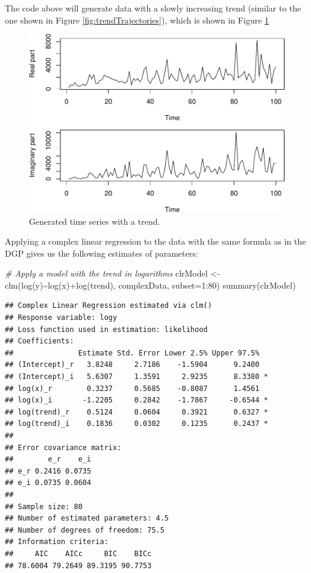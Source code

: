 \documentclass[
]{book}
\newenvironment{Shaded}{\begin{snugshade}}{\end{snugshade}}
\newcommand{\AttributeTok}[1]{\textcolor[rgb]{0.77,0.63,0.00}{#1}}
\newcommand{\CommentTok}[1]{\textcolor[rgb]{0.56,0.35,0.01}{\textit{#1}}}
\newcommand{\DecValTok}[1]{\textcolor[rgb]{0.00,0.00,0.81}{#1}}
\newcommand{\FunctionTok}[1]{\textcolor[rgb]{0.00,0.00,0.00}{#1}}
\newcommand{\NormalTok}[1]{#1}
\newcommand{\OtherTok}[1]{\textcolor[rgb]{0.56,0.35,0.01}{#1}}
\newcommand{\SpecialCharTok}[1]{\textcolor[rgb]{0.00,0.00,0.00}{#1}}
\begin{document}
The code above will generate data with a slowly increasing trend (similar to the one shown in Figure \ref{fig:trendTrajectories}), which is shown in Figure \ref{fig:dataWithTrend}

\begin{figure}
\centering
\includegraphics{Svetunkov---Svetunkov---Complex-Valued-Econometrics_files/figure-latex/dataWithTrend-1.pdf}
\caption{\label{fig:dataWithTrend}Generated time series with a trend.}
\end{figure}

Applying a complex linear regression to the data with the same formula as in the DGP gives us the following estimates of parameters:

\begin{Shaded}
\begin{Highlighting}[]
\CommentTok{\# Apply a model with the trend in logarithms}
\NormalTok{clrModel }\OtherTok{\textless{}{-}} \FunctionTok{clm}\NormalTok{(}\FunctionTok{log}\NormalTok{(y)}\SpecialCharTok{\textasciitilde{}}\FunctionTok{log}\NormalTok{(x)}\SpecialCharTok{+}\FunctionTok{log}\NormalTok{(trend), complexData, }\AttributeTok{subset=}\DecValTok{1}\SpecialCharTok{:}\DecValTok{80}\NormalTok{)}
\FunctionTok{summary}\NormalTok{(clrModel)}
\end{Highlighting}
\end{Shaded}

\begin{verbatim}
## Complex Linear Regression estimated via clm()
## Response variable: logy
## Loss function used in estimation: likelihood
## Coefficients:
##               Estimate Std. Error Lower 2.5% Upper 97.5%  
## (Intercept)_r   3.8248     2.7186    -1.5904      9.2400  
## (Intercept)_i   5.6307     1.3591     2.9235      8.3380 *
## log(x)_r        0.3237     0.5685    -0.8087      1.4561  
## log(x)_i       -1.2205     0.2842    -1.7867     -0.6544 *
## log(trend)_r    0.5124     0.0604     0.3921      0.6327 *
## log(trend)_i    0.1836     0.0302     0.1235      0.2437 *
## 
## Error covariance matrix:
##        e_r    e_i
## e_r 0.2416 0.0735
## e_i 0.0735 0.0604
## 
## Sample size: 80
## Number of estimated parameters: 4.5
## Number of degrees of freedom: 75.5
## Information criteria:
##     AIC    AICc     BIC    BICc 
## 78.6004 79.2649 89.3195 90.7753
\end{verbatim}
\end{document}
